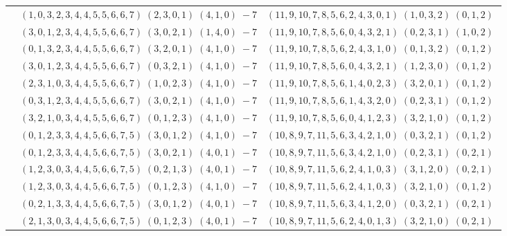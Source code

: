 \documentclass[11pt]{article}
\begin{document}
\begin{longtable}[l]{|c|c|c|}
 \cline{2-3} 
 & $(1 ,0 ,3 ,2 ,3 ,4 ,4 ,5 ,5 ,6 ,6 ,7) \;(2 ,3 ,0 ,1) \;(4 ,1 ,0) \;-7$ & $(11 ,9 ,10 ,7 ,8 ,5 ,6 ,2 ,4 ,3 ,0 ,1) \;(1 ,0 ,3 ,2) \;(0 ,1 ,2) \;$\\ 
 \cline{2-3} 
 & $(3 ,0 ,1 ,2 ,3 ,4 ,4 ,5 ,5 ,6 ,6 ,7) \;(3 ,0 ,2 ,1) \;(1 ,4 ,0) \;-7$ & $(11 ,9 ,10 ,7 ,8 ,5 ,6 ,0 ,4 ,3 ,2 ,1) \;(0 ,2 ,3 ,1) \;(1 ,0 ,2) \;$\\ 
 \cline{2-3} 
 & $(0 ,1 ,3 ,2 ,3 ,4 ,4 ,5 ,5 ,6 ,6 ,7) \;(3 ,2 ,0 ,1) \;(4 ,1 ,0) \;-7$ & $(11 ,9 ,10 ,7 ,8 ,5 ,6 ,2 ,4 ,3 ,1 ,0) \;(0 ,1 ,3 ,2) \;(0 ,1 ,2) \;$\\ 
 \cline{2-3} 
 & $(3 ,0 ,1 ,2 ,3 ,4 ,4 ,5 ,5 ,6 ,6 ,7) \;(0 ,3 ,2 ,1) \;(4 ,1 ,0) \;-7$ & $(11 ,9 ,10 ,7 ,8 ,5 ,6 ,0 ,4 ,3 ,2 ,1) \;(1 ,2 ,3 ,0) \;(0 ,1 ,2) \;$\\ 
 \cline{2-3} 
 & $(2 ,3 ,1 ,0 ,3 ,4 ,4 ,5 ,5 ,6 ,6 ,7) \;(1 ,0 ,2 ,3) \;(4 ,1 ,0) \;-7$ & $(11 ,9 ,10 ,7 ,8 ,5 ,6 ,1 ,4 ,0 ,2 ,3) \;(3 ,2 ,0 ,1) \;(0 ,1 ,2) \;$\\ 
 \cline{2-3} 
 & $(0 ,3 ,1 ,2 ,3 ,4 ,4 ,5 ,5 ,6 ,6 ,7) \;(3 ,0 ,2 ,1) \;(4 ,1 ,0) \;-7$ & $(11 ,9 ,10 ,7 ,8 ,5 ,6 ,1 ,4 ,3 ,2 ,0) \;(0 ,2 ,3 ,1) \;(0 ,1 ,2) \;$\\ 
 \cline{2-3} 
 & $(3 ,2 ,1 ,0 ,3 ,4 ,4 ,5 ,5 ,6 ,6 ,7) \;(0 ,1 ,2 ,3) \;(4 ,1 ,0) \;-7$ & $(11 ,9 ,10 ,7 ,8 ,5 ,6 ,0 ,4 ,1 ,2 ,3) \;(3 ,2 ,1 ,0) \;(0 ,1 ,2) \;$\\ 
 \cline{2-3} 
 & $(0 ,1 ,2 ,3 ,3 ,4 ,4 ,5 ,6 ,6 ,7 ,5) \;(3 ,0 ,1 ,2) \;(4 ,1 ,0) \;-7$ & $(10 ,8 ,9 ,7 ,11 ,5 ,6 ,3 ,4 ,2 ,1 ,0) \;(0 ,3 ,2 ,1) \;(0 ,1 ,2) \;$\\ 
 \cline{2-3} 
 & $(0 ,1 ,2 ,3 ,3 ,4 ,4 ,5 ,6 ,6 ,7 ,5) \;(3 ,0 ,2 ,1) \;(4 ,0 ,1) \;-7$ & $(10 ,8 ,9 ,7 ,11 ,5 ,6 ,3 ,4 ,2 ,1 ,0) \;(0 ,2 ,3 ,1) \;(0 ,2 ,1) \;$\\ 
 \cline{2-3} 
 & $(1 ,2 ,3 ,0 ,3 ,4 ,4 ,5 ,6 ,6 ,7 ,5) \;(0 ,2 ,1 ,3) \;(4 ,0 ,1) \;-7$ & $(10 ,8 ,9 ,7 ,11 ,5 ,6 ,2 ,4 ,1 ,0 ,3) \;(3 ,1 ,2 ,0) \;(0 ,2 ,1) \;$\\ 
 \cline{2-3} 
 & $(1 ,2 ,3 ,0 ,3 ,4 ,4 ,5 ,6 ,6 ,7 ,5) \;(0 ,1 ,2 ,3) \;(4 ,1 ,0) \;-7$ & $(10 ,8 ,9 ,7 ,11 ,5 ,6 ,2 ,4 ,1 ,0 ,3) \;(3 ,2 ,1 ,0) \;(0 ,1 ,2) \;$\\ 
 \cline{2-3} 
 & $(0 ,2 ,1 ,3 ,3 ,4 ,4 ,5 ,6 ,6 ,7 ,5) \;(3 ,0 ,1 ,2) \;(4 ,0 ,1) \;-7$ & $(10 ,8 ,9 ,7 ,11 ,5 ,6 ,3 ,4 ,1 ,2 ,0) \;(0 ,3 ,2 ,1) \;(0 ,2 ,1) \;$\\ 
 \cline{2-3} 
 & $(2 ,1 ,3 ,0 ,3 ,4 ,4 ,5 ,6 ,6 ,7 ,5) \;(0 ,1 ,2 ,3) \;(4 ,0 ,1) \;-7$ & $(10 ,8 ,9 ,7 ,11 ,5 ,6 ,2 ,4 ,0 ,1 ,3) \;(3 ,2 ,1 ,0) \;(0 ,2 ,1) \;$\\ 

\end{longtable}
\end{document}
